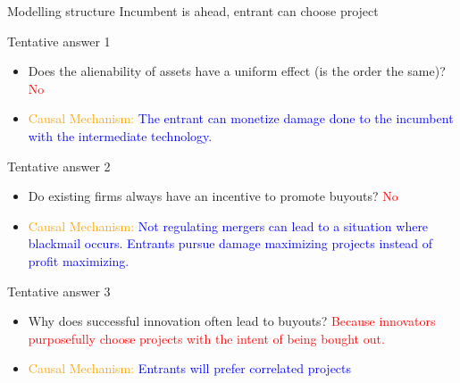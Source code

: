 \documentclass{beamer}
\numberwithin{equation}{section}
\begin{document}
\begin{frame}{Modelling structure}
Incumbent is ahead, entrant can choose project 
\end{frame}
\begin{frame}{Tentative answer 1}
\begin{itemize}
    \item Does the alienability of assets have a uniform effect (is the order the same)? \textcolor{red}{No}
    \item \textcolor{orange}{Causal Mechanism:} \textcolor{blue}{The entrant can monetize damage done to the incumbent with the intermediate technology.}
\end{itemize}
\end{frame}
\begin{frame}{Tentative answer 2}
\begin{itemize}
    \item Do existing firms always have an incentive to promote buyouts? \textcolor{red}{No}
    \item \textcolor{orange}{Causal Mechanism:} \textcolor{blue}{Not regulating mergers can lead to a situation where blackmail occurs. Entrants pursue damage maximizing projects instead of profit maximizing.}
\end{itemize}
\end{frame}
\begin{frame}{Tentative answer 3}
\begin{itemize}
    \item Why does successful innovation often lead to buyouts?\textcolor{red}{ Because innovators purposefully choose projects with the intent of being bought out.}
    \item \textcolor{orange}{Causal Mechanism:} \textcolor{blue}{Entrants will prefer correlated projects}
\end{itemize}
\end{frame}
\end{document}
